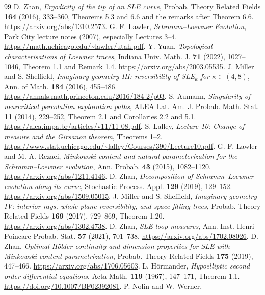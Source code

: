 \documentclass[11pt]{article}
\theoremstyle{definition}\newtheorem{definition}[theorem]{Definition}
\theoremstyle{remark}\newtheorem{remark}[theorem]{Remark}
\begin{document}
\begin{thebibliography}{99}
D. Zhan, \emph{Ergodicity of the tip of an SLE curve},
Probab. Theory Related Fields \textbf{164} (2016), 333--360,
Theorems 5.3 and 6.6 and the remarks after Theorem 6.6.
\url{https://arxiv.org/abs/1310.2573}.
 G. F. Lawler, \emph{Schramm--Loewner Evolution},
Park City lecture notes (2007), especially Lectures 3--4.
\url{https://math.uchicago.edu/~lawler/utah.pdf}.
 Y. Yuan, \emph{Topological characterisations of Loewner traces},
Indiana Univ. Math. J. \textbf{71} (2022), 1027--1046,
Theorem 1.1 and Remark 1.4. \url{https://arxiv.org/abs/2003.05535}.
 J. Miller and S. Sheffield, \emph{Imaginary geometry III:
reversibility of SLE$_\kappa$ for $\kappa\in(4,8)$},
Ann. of Math. \textbf{184} (2016), 455--486.
\url{https://annals.math.princeton.edu/2016/184-2/p03}.
 S. Aumann,
\emph{Singularity of nearcritical percolation exploration paths},
ALEA Lat. Am. J. Probab. Math. Stat. \textbf{11} (2014), 229--252,
Theorem 2.1 and Corollaries 2.2 and 5.1.
\url{https://alea.impa.br/articles/v11/11-08.pdf}.
 S. Lalley,
\emph{Lecture 10: Change of measure and the Girsanov theorem},
Theorems 1--2.
\url{https://www.stat.uchicago.edu/~lalley/Courses/390/Lecture10.pdf}.
 G. F. Lawler and M. A. Rezaei,
\emph{Minkowski content and natural parameterization for the
Schramm--Loewner evolution}, Ann. Probab. \textbf{43} (2015), 1082--1120.
\url{https://arxiv.org/abs/1211.4146}.
 D. Zhan,
\emph{Decomposition of Schramm--Loewner evolution along its curve},
Stochastic Process. Appl. \textbf{129} (2019), 129--152.
\url{https://arxiv.org/abs/1509.05015}.
 J. Miller and S. Sheffield,
\emph{Imaginary geometry IV: interior rays, whole-plane reversibility,
and space-filling trees}, Probab. Theory Related Fields \textbf{169}
(2017), 729--869, Theorem 1.20.
\url{https://arxiv.org/abs/1302.4738}.
 D. Zhan, \emph{SLE loop measures},
Ann. Inst. Henri Poincare Probab. Stat. \textbf{57} (2021), 701--738.
\url{https://arxiv.org/abs/1702.08026}.
 D. Zhan,
\emph{Optimal H\"older continuity and dimension properties for SLE with
Minkowski content parametrization}, Probab. Theory Related Fields
\textbf{175} (2019), 447--466.
\url{https://arxiv.org/abs/1706.05603}.
 L. H\"ormander,
\emph{Hypoelliptic second order differential equations},
Acta Math. \textbf{119} (1967), 147--171, Theorem 1.1.
\url{https://doi.org/10.1007/BF02392081}.
 P. Nolin and W. Werner,

\end{thebibliography}
\end{document}
